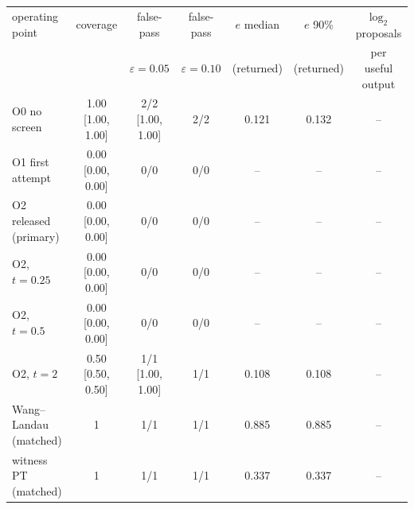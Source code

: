 \begin{tabular}{lcccccc}
\toprule
operating point & coverage & false-pass & false-pass & $e$ median & $e$ 90\% & $\log_2$ proposals \\
 & & $\varepsilon{=}0.05$ & $\varepsilon{=}0.10$ & (returned) & (returned) & per useful output \\
\midrule
O0 no screen & 1.00 [1.00, 1.00] & 2/2 [1.00, 1.00] & 2/2 & 0.121 & 0.132 & -- \\
O1 first attempt & 0.00 [0.00, 0.00] & 0/0 & 0/0 & -- & -- & -- \\
O2 released (primary) & 0.00 [0.00, 0.00] & 0/0 & 0/0 & -- & -- & -- \\
O2, $t{=}0.25$ & 0.00 [0.00, 0.00] & 0/0 & 0/0 & -- & -- & -- \\
O2, $t{=}0.5$ & 0.00 [0.00, 0.00] & 0/0 & 0/0 & -- & -- & -- \\
O2, $t{=}2$ & 0.50 [0.50, 0.50] & 1/1 [1.00, 1.00] & 1/1 & 0.108 & 0.108 & -- \\
\midrule
Wang--Landau (matched) & 1 & 1/1 & 1/1 & 0.885 & 0.885 & -- \\
witness PT (matched) & 1 & 1/1 & 1/1 & 0.337 & 0.337 & -- \\
\bottomrule
\end{tabular}
